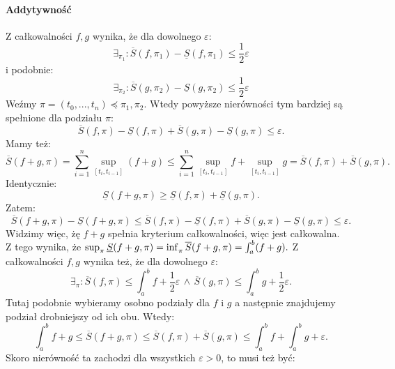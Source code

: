 \documentclass{article}
\numberwithin{defi}{section}
\numberwithin{defi}{section}
\renewcommand{\inf}{\mathop{\mathrm{inf}\vphantom{\mathrm{sup}}}}
\newcommand{\Sd}{\underline{S}}
\newcommand{\Sg}{\overline{S}}
\newcommand{\przedz}[2]{[#1 _ {#2}, #1_{#2 - 1}]}
\providecommand{\eps}{\varepsilon}
\providecommand{\half}{\frac{1}{2}}
\renewcommand{\geq}{\geqslant}
\renewcommand{\leq}{\leqslant}
\begin{document}
\begin{dow}{}
    \paragraph{Addytywność} Z całkowalności $f, g$ wynika, że dla dowolnego $\eps$: \begin{equation*}
        \exists_{\pi_1}: \Sg(f, \pi_1) - \Sd(f, \pi_1) \leq \half \eps
    \end{equation*} i podobnie: \begin{equation*}
        \exists_{\pi_2}: \Sg(g, \pi_2) - \Sd(g, \pi_2) \leq \half \eps
    \end{equation*} Weźmy $\pi = (t_0, ..., t_n) \preceq \pi_1, \pi_2$. Wtedy powyższe nierówności tym bardziej są spełnione dla podziału $\pi$: \begin{equation*}
        \Sg(f, \pi) - \Sd(f, \pi) + \Sg(g, \pi) - \Sd(g, \pi) \leq \eps.
    \end{equation*} Mamy też: \begin{equation*}
        \Sg(f + g, \pi) = \sum_{i = 1}^{n} \sup_{\przedz{t}{i}} (f + g) \leq  \sum_{i = 1}^{n} \sup_{\przedz{t}{i}} f + \sup_{\przedz{t}{i}} g = \Sg(f, \pi) + \Sg(g, \pi).
    \end{equation*} Identycznie: \begin{equation*}
        \Sd(f + g, \pi) \geq \Sd(f, \pi) + \Sd(g, \pi).
    \end{equation*} Zatem: \begin{equation}
        \Sg(f + g, \pi) - \Sd(f + g, \pi) \leq \Sg(f, \pi) - \Sd(f, \pi) + \Sg(g, \pi) - \Sd(g, \pi) \leq \eps.
    \end{equation} Widzimy więc, żę $f +g$ spełnia kryterium całkowalności, więc jest całkowalna.\\
    Z tego wynika, że $\sup_{\pi} \Sd(f + g, \pi) = \inf_{\pi} \Sg(f + g, \pi) = \int_{a}^{b} (f + g).$ Z całkowalności $f, g$ wynika też, że dla dowolnego $\eps$: \begin{equation*}
        \exists_{\pi}: \Sg(f, \pi) \leq \int_{a}^{b} f + \half \eps \, \wedge \, \Sg(g, \pi) \leq \int_{a}^{b} g + \half \eps.
    \end{equation*} Tutaj podobnie wybieramy osobno podziały dla $f$ i $g$ a następnie znajdujemy podział drobniejszy od ich obu. Wtedy: \begin{equation*}
        \int_{a}^{b} f + g \leq \Sg(f + g, \pi) \leq \Sg(f , \pi) + \Sg(g, \pi) \leq  \int_{a}^{b} f +  \int_{a}^{b} g + \eps.
    \end{equation*} Skoro nierówność ta zachodzi dla wszystkich $\eps > 0$, to musi też być: \begin{equation*}

\end{equation*}
\end{dow}
\end{document}
